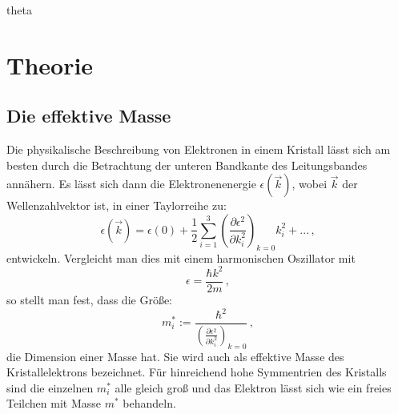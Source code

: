 theta\section{Theorie}
\subsection{Die effektive Masse}%
Die physikalische Beschreibung von Elektronen in einem Kristall lässt sich am besten durch die Betrachtung der unteren Bandkante des Leitungsbandes annähern. Es lässt sich dann die Elektronenenergie $\epsilon(\vec{k})$, wobei $\vec{k}$ der Wellenzahlvektor ist, in einer Taylorreihe zu:
\begin{equation}
\epsilon(\vec{k})=\epsilon\left(0\right)+\frac{1}{2}\sum_{i=1}^3\left(\frac{\partial\epsilon^2}{\partial k_i^2}\right)_{k=0}k_i^2+...\,,
\end{equation}
entwickeln.
Vergleicht man dies mit einem harmonischen Oszillator mit
\begin{equation}
  \epsilon=\frac{\hbar k^2}{2m}\,,
\end{equation}
so stellt man fest, dass die Größe:
\begin{equation}
m_i^*:=\frac{\hbar^2}{\left(\frac{\partial\epsilon^2}{\partial k_i^2}\right)_{k=0}}\,,
\end{equation}
die Dimension einer Masse hat. Sie wird auch als effektive Masse des Kristallelektrons bezeichnet.
Für hinreichend hohe Symmentrien des Kristalls sind die einzelnen $m_i^*$ alle gleich groß und das Elektron lässt sich wie ein freies Teilchen mit Masse $m^*$ behandeln.
